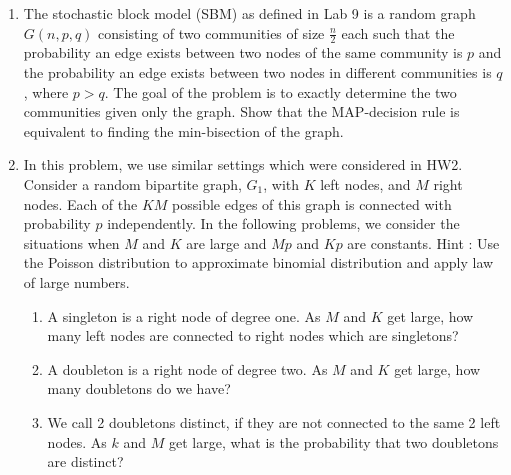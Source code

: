 \begin{enumerate}
  \item The stochastic block model (SBM) as defined in Lab 9 is a random graph $G(n,p,q)$ consisting of two communities of size $\frac{n}{2}$ each such that the probability an edge exists between two nodes of the same community is $p$ and the probability an edge exists between two nodes in different communities is $q$, where $p > q$. The goal of the problem is to exactly determine the two communities given only the graph. Show that the MAP-decision rule is equivalent to finding the min-bisection of the graph.
  \item In this problem, we use similar settings which were considered in HW2. Consider a random bipartite graph, $G_1$, with $K$ left nodes, and $M$ right nodes. Each of the $KM$ possible edges of this graph is connected with probability $p$ independently. In the following problems, we consider the situations when $M$ and $K$ are large and $Mp$ and $Kp$ are constants. Hint : Use the Poisson distribution to approximate binomial distribution and apply law of large numbers.
    \begin{enumerate}
      \item A singleton is a right node of degree one. As $M$ and $K$ get large, how many left nodes are connected to right nodes which are singletons?
      \item A doubleton is a right node of degree two. As $M$ and $K$ get large, how many doubletons do we have?
      \item We call 2 doubletons distinct, if they are not connected to the same 2 left nodes. As $k$ and $M$ get large, what is the probability that two doubletons are distinct?
    \end{enumerate}
\end{enumerate}


